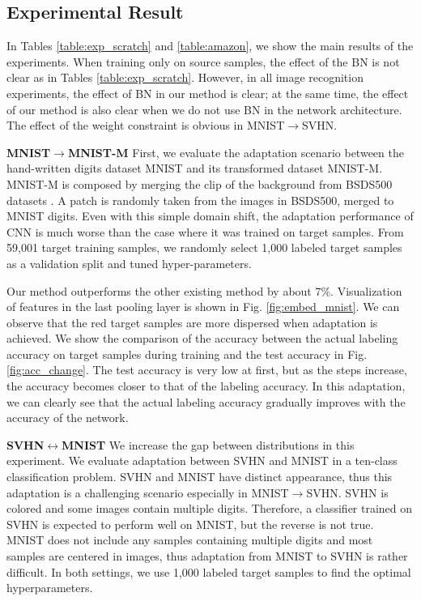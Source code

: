 \documentclass{article}
\begin{document}
\subsection{Experimental Result}
In Tables \ref{table:exp_scratch} and \ref{table:amazon}, we show the main results of the experiments.
When training only on source samples, the effect of the BN is not clear as in Tables \ref{table:exp_scratch}.
However, in all image recognition experiments, the effect of BN in our method is clear; at the same time, the effect of our method is also clear when we do not use BN in the network architecture. The effect of the weight constraint is obvious in MNIST$\rightarrow$SVHN.

\textbf{MNIST$\rightarrow$MNIST-M}
First, we evaluate the adaptation scenario between the hand-written digits dataset MNIST and its transformed dataset MNIST-M. MNIST-M is composed by merging the clip of the background from BSDS500 datasets \cite{arbelaez2011contour}. A patch is randomly taken from the images in BSDS500, merged to MNIST digits. Even with this simple domain shift, the adaptation performance of CNN is much worse than the case where it was trained on target samples. From 59,001 target training samples, we randomly select 1,000 labeled target samples as a validation split and tuned hyper-parameters.

Our method outperforms the other existing method by about 7\%. Visualization of features in the last pooling layer is shown in Fig. \ref{fig:embed_mnist}. We can observe that the red target samples are more dispersed when adaptation is achieved. We show the comparison of the accuracy between the actual labeling accuracy on target samples during training and the test accuracy in Fig. \ref{fig:acc_change}. The test accuracy is very low at first, but as the steps increase, the accuracy becomes closer to that of the labeling accuracy. In this adaptation, we can clearly see that the actual labeling accuracy gradually improves with the accuracy of the network.

\textbf{SVHN$\leftrightarrow$MNIST}
We increase the gap between distributions in this experiment. We evaluate adaptation between SVHN \cite{netzer2011reading} and MNIST in a ten-class classification problem. SVHN and MNIST have distinct appearance, thus this adaptation is a challenging scenario especially in MNIST$\rightarrow$SVHN. SVHN is colored and some images contain multiple digits. Therefore, a classifier trained on SVHN is expected to perform well on MNIST, but the reverse is not true. MNIST does not include any samples containing multiple digits and most samples are centered in images, thus adaptation from MNIST to SVHN is rather difficult. In both settings, we use 1,000 labeled target samples to find the optimal hyperparameters.
\end{document}
